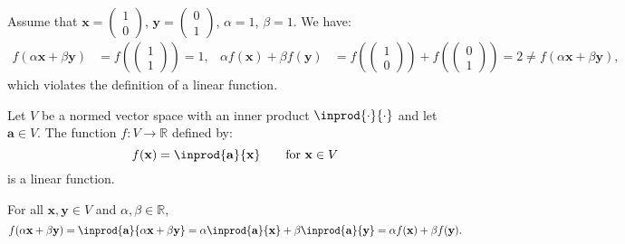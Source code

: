 \documentclass{huhtakm-template-book-v2}
\begin{document}
    \begin{proofing}
        Assume that $\mathbf{x}=\begin{pmatrix}1\\0\end{pmatrix}$, $\mathbf{y}=\begin{pmatrix}0\\1\end{pmatrix}$, $\alpha=1$, $\beta=1$. We have:
        \begin{align*}
            f(\alpha\mathbf{x}+\beta\mathbf{y})&=f\left(\begin{pmatrix}1\\1\end{pmatrix}\right)=1, & \alpha f(\mathbf{x})+\beta f(\mathbf{y})&=f\left(\begin{pmatrix}1\\0\end{pmatrix}\right)+f\left(\begin{pmatrix}0\\1\end{pmatrix}\right)=2\neq f(\alpha\mathbf{x}+\beta\mathbf{y}),
        \end{align*}
        which violates the definition of a linear function.
    \end{proofing}
    \begin{eg}
        \label{Chapter 4 (Example) Inner product with fixed vector is a linear function}
        Let $V$ be a normed vector space with an inner product $\inprod{\cdot}{\cdot}$ and let $\mathbf{a}\in V$. The function $f:V\to\mathbb{R}$ defined by:
        \begin{equation*}
            f(\mathbf{x})=\inprod{\mathbf{a}}{\mathbf{x}} \qquad \text{for } \mathbf{x}\in V
        \end{equation*} 
        is a linear function.
    \end{eg}
    \begin{proofing}
        For all $\mathbf{x},\mathbf{y}\in V$ and $\alpha,\beta\in\mathbb{R}$,
        \begin{equation*}
            f(\alpha\mathbf{x}+\beta\mathbf{y})=\inprod{\mathbf{a}}{\alpha\mathbf{x}+\beta\mathbf{y}}=\alpha\inprod{\mathbf{a}}{\mathbf{x}}+\beta\inprod{\mathbf{a}}{\mathbf{y}}=\alpha f(\mathbf{x})+\beta f(\mathbf{y}).
        \end{equation*}
    \end{proofing}
    \newpage
\end{document}
